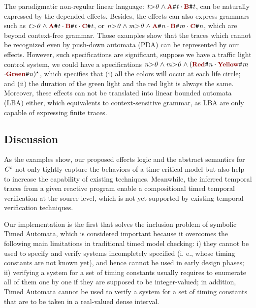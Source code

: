 \documentclass[acmsmall,10pt,review]{acmart}
\newcommand{\anyevent}[1]{{\textcolor{darkred}
{{\textbf{\small #1}}}}}
\newcommand{\code}[1]{{\tt{\ensuremath{\m{#1}}}}}
\newcommand{\m}{\mathit}
\newcommand{\mysharp}{{\mathrel{\texttt{\#}}}}
\newcommand{\timedL}{\code{C^{t}}}
\begin{document}
{{{The paradigmatic non-regular linear language: 
\code{t{>} 0 \wedge \anyevent{A}\mysharp{t}\cdot\anyevent{B}\mysharp{t}}, 
can be naturally expressed by the depended effects. 
Besides, the effects can also express grammars such as \code{t{>} 0 
\wedge \anyevent{A}\mysharp{t}\cdot\anyevent{B}\mysharp{t}
\cdot\anyevent{C}\mysharp{t}}, or 
\code{n{>} 0 \wedge m{>} 0 \wedge  \anyevent{A}\mysharp{n}
\cdot\anyevent{B}\mysharp{m}\cdot\anyevent{C}\mysharp{n}}, 
which are beyond context-free grammar.
Those examples show that the traces which cannot be recognized 
even by push-down automata (PDA) can be represented by our effects. 
However, such specifications are significant, suppose we 
have a traffic light control system, we could have a 
specifications \code{n{>} 0 \wedge m{>} 0 \wedge  
(\anyevent{Red}\mysharp{n}\cdot\anyevent{Yellow}\mysharp{m}}
\code{\cdot \anyevent{Green}\mysharp{n})^\star}, which specifies that  
(i) all the colors will occur at each life circle; and 
(ii) the duration of the green light and the red light is 
always the same. Moreover, these effects can not be translated 
into linear bounded automata (LBA) either, which equivalents to 
context-sensitive grammar, as LBA are only capable of expressing 
finite traces.  


\subsection{Discussion}

As the examples show, our proposed effects logic and the abstract semantics for 
\code{\timedL} not only tightly capture the behaviors of a time-critical model 
but also help to increase the capability of existing techniques. 
Meanwhile, the inferred temporal traces from a given reactive program enable a compositional 
timed temporal verification at the source level, which is not yet supported by existing temporal 
verification techniques. 

Our implementation is the first that solves the  inclusion problem of symbolic Timed Automata, 
which is considered important because it overcomes the following main limitations in traditional 
timed model checking:  i) they cannot be used to specify and verify systems incompletely 
specified (i. e., whose timing constants are not known yet), and hence cannot be used in early 
design phases; ii) verifying a system for a set of timing constants usually requires to enumerate 
all of them one by one if they are supposed to be integer-valued; in addition, Timed Automata 
cannot be used to verify a system for a set of timing constants that are to be taken in a 
real-valued dense interval. 



}}}
\end{document}
